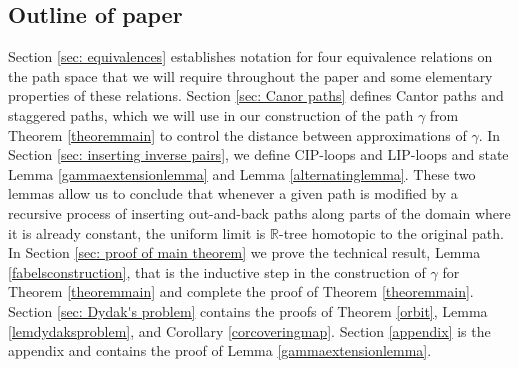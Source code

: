 \documentclass[12pt, leqno]{amsart}
\newcommand{\bbr}{\mathbb{R}}
\theoremstyle{definition}\newtheorem{definition}[theorem]{Definition}
\newtheorem{conjecture}[theorem]{Conjecture}
\begin{document}
\subsection*{Outline of paper}
Section \ref{sec: equivalences} establishes notation for four equivalence relations on the path space that we will require throughout the paper and some elementary properties of these relations.  Section \ref{sec: Canor paths} defines Cantor paths and staggered paths, which we will use in our construction of the path $\gamma$ from Theorem \ref{theoremmain} to control the distance between approximations of $\gamma$.
In Section \ref{sec: inserting inverse pairs}, we define CIP-loops and LIP-loops and state Lemma \ref{gammaextensionlemma} and Lemma \ref{alternatinglemma}.  These two lemmas allow us to conclude that whenever a given path is modified by a recursive process of inserting out-and-back paths along parts of the domain where it is already constant, the uniform limit is $\bbr$-tree homotopic to the original path.  In Section \ref{sec: proof of main theorem}  we prove the technical result, Lemma \ref{fabelsconstruction}, that is the inductive step in the construction of  $\gamma$ for Theorem \ref{theoremmain} and complete the proof of Theorem \ref{theoremmain}.  Section \ref{sec: Dydak's problem} contains the proofs of Theorem \ref{orbit}, Lemma \ref{lemdydaksproblem}, and Corollary \ref{corcoveringmap}.  Section \ref{appendix} is the appendix and contains the proof of Lemma \ref{gammaextensionlemma}.





\end{document}
